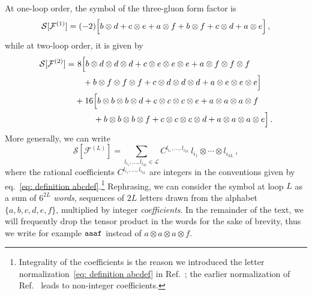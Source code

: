 \documentclass[12pt]{article}
\newcommand{\cL}{\mathcal{L}}
\newcommand{\cF}{\mathcal{F}}
\begin{document}
At one-loop order, 
the symbol of the three-gluon form factor is
\begin{equation}
    \label{eq: one-loop example}
    \begin{aligned}
    \mathcal{S}[\cF^{(1)}] = (-2) \Bigl[ b \otimes d + c \otimes e + a \otimes f
  + b \otimes f + c \otimes d + a \otimes e \Bigr] \,,        
    \end{aligned}
\end{equation}
while at two-loop order, 
it is given by
\begin{equation}
    \label{eq: two-loop example}
   \begin{aligned}
       \mathcal{S}[\cF^{(2)}] =&\ {}8 \Bigl[
    b \otimes d \otimes d \otimes d
  + c \otimes e \otimes e \otimes e
  + a \otimes f \otimes f \otimes f \\
&\hphantom{{}8 \Bigl[}
  + b \otimes f \otimes f \otimes f
  + c \otimes d \otimes d \otimes d
  + a \otimes e \otimes e \otimes e \Bigr] \\
&
+ 16 \Bigl[
    b \otimes b \otimes b \otimes d
  + c \otimes c \otimes c \otimes e
  + a \otimes a \otimes a \otimes f \\
&\hphantom{ + 16 \Bigl[}
  + b \otimes b \otimes b \otimes f
  + c \otimes c \otimes c \otimes d
  + a \otimes a \otimes a \otimes e \Bigr]\,.
   \end{aligned}
\end{equation}
%
More generally, we can write 
\begin{equation}
    \label{eq: symbol in general}
    \mathcal{S}[{\cF}^{(L)}] =
       \sum_{l_{i_1},\ldots,l_{i_{2L}}\in\cL} C^{l_{i_1},\ldots, l_{i_{2L}}} \,
l_{i_1} \otimes \cdots \otimes l_{i_{2L}} \,,
\end{equation}
where the rational coefficients $C^{l_{i_1},\ldots, l_{i_{2L}}}$ are integers in the conventions given by eq.~\eqref{eq: definition abcdef}.\footnote{Integrality of the coefficients is the reason we introduced the letter normalization~\eqref{eq: definition abcdef} in Ref.~\citep{Cai:2024znx}; the earlier normalization of 
Ref.~\citep{Dixon:2022rse} leads to non-integer coefficients.}
Rephrasing, we can consider the symbol at loop $L$ as a sum of $6^{2L}$ \emph{words}, sequences of $2L$ letters drawn from the alphabet $\{a,b,c,d,e,f\}$, multiplied by integer \emph{coefficients}. 
In the remainder of the text, we will frequently drop the tensor product in the words for the sake of brevity, thus we write for example $\tt aaaf$ instead of $ a\otimes a\otimes a\otimes f$.
\end{document}
